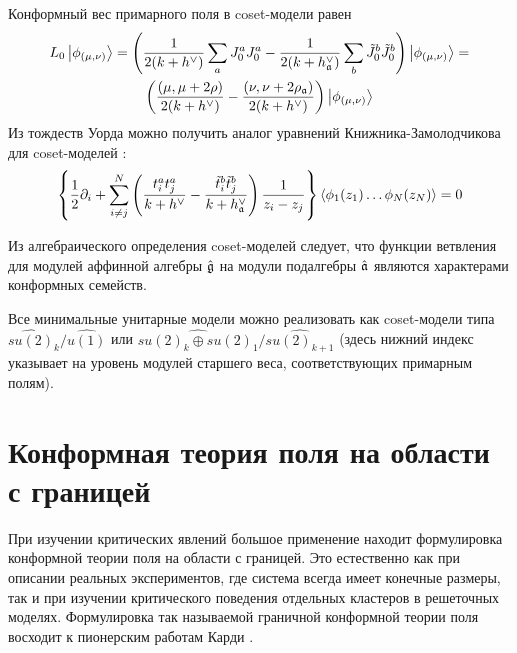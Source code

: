 Конформный вес примарного поля в coset-модели равен
\begin{multline}
  L_0\left|\phi_{(\mu,\nu)}\right>=\left(\frac{1}{2(k+h^{\vee})}\sum_aJ^a_0J^a_0-\frac{1}{2(k+h_{\mathfrak{a}}^{\vee})}\sum_b \tilde{J}^b_0 \tilde{J}^b_0 \right)
  \left|\phi_{(\mu,\nu)}\right>=\\
  \left(\frac{(\mu,\mu+2\rho)}{2(k+h^{\vee})}-\frac{(\nu,\nu+2\rho_{\mathfrak{a}})}{2(k+h^{\vee})}\right)\left|\phi_{(\mu,\nu)}\right>
\end{multline}
Из тождеств Уорда можно получить аналог уравнений Книжника-Замолодчикова для coset-моделей \cite{kogan1997knizhnik}:
\begin{equation}
  \left\{\frac{1}{2}\partial_{i} + \sum_{i\neq j}^{N}\left(\frac{t^{a}_{i}t^{a}_{j}}{k+h^{\vee}}-\frac{\tilde t^{b}_{i}\tilde t^{b}_{j}}{k+h^{\vee}_{\mathfrak{a}}}\right)\frac{1}{z_{i}-z_{j}}\right\} \left<\phi_{1}(z_{1})\dots \phi_{N}(z_{N})\right>=0
  \label{eq:101}
\end{equation}

Из алгебраического определения coset-моделей следует, что функции ветвления для модулей аффинной алгебры $\hat{\mathfrak{g}}$ на модули подалгебры $\hat{\mathfrak{a}}$ являются характерами конформных семейств. 

Все минимальные унитарные модели можно реализовать как coset-модели типа $\widehat{su(2)}_k/\widehat{u(1)}$ или $\widehat{su(2)_k\oplus su(2)_1}/\widehat{su(2)_{k+1}}$ (здесь нижний индекс указывает на уровень модулей старшего веса, соответствующих примарным полям). 

\section{Конформная теория поля на области с границей}
\label{sec:boundary-cft}



При изучении критических явлений большое применение находит формулировка конформной теории поля на области с границей. Это естественно как при описании реальных экспериментов, где система всегда имеет конечные размеры, так и при изучении критического поведения отдельных кластеров в решеточных моделях. Формулировка так называемой граничной конформной теории поля восходит к пионерским работам Карди \cite{cardy1984conformal,cardy1989boundary,cardy1986effect}. 

